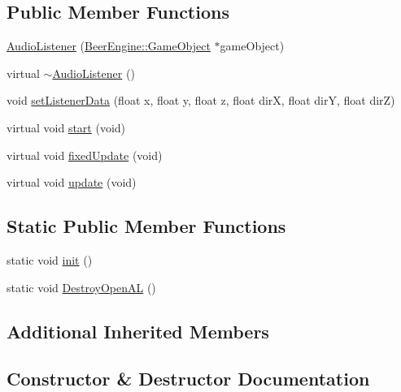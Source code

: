\subsection*{Public Member Functions}
\begin{DoxyCompactItemize}
\item 
\mbox{\hyperlink{class_beer_engine_1_1_audio_1_1_audio_listener_a7f652b4e6cd4df8038630081fa475d62}{Audio\+Listener}} (\mbox{\hyperlink{class_beer_engine_1_1_game_object}{Beer\+Engine\+::\+Game\+Object}} $\ast$game\+Object)
\item 
virtual \mbox{\hyperlink{class_beer_engine_1_1_audio_1_1_audio_listener_a7fb8733754e4c09b5a32792b3beb78b1}{$\sim$\+Audio\+Listener}} ()
\item 
void \mbox{\hyperlink{class_beer_engine_1_1_audio_1_1_audio_listener_a8d22256683171dcdc258a5e3f707701c}{set\+Listener\+Data}} (float x, float y, float z, float dirX, float dirY, float dirZ)
\item 
virtual void \mbox{\hyperlink{class_beer_engine_1_1_audio_1_1_audio_listener_a1d4d5e21f30edb7dba64e87f0712c3b3}{start}} (void)
\item 
virtual void \mbox{\hyperlink{class_beer_engine_1_1_audio_1_1_audio_listener_ad3d6b34a33582c17e2c7bc250e4e6937}{fixed\+Update}} (void)
\item 
virtual void \mbox{\hyperlink{class_beer_engine_1_1_audio_1_1_audio_listener_a32c348d619ff2ca57d16af803d7dfcfd}{update}} (void)
\end{DoxyCompactItemize}
\subsection*{Static Public Member Functions}
\begin{DoxyCompactItemize}
\item 
static void \mbox{\hyperlink{class_beer_engine_1_1_audio_1_1_audio_listener_ab5d881529114f89d6d01a043f84fc14e}{init}} ()
\item 
static void \mbox{\hyperlink{class_beer_engine_1_1_audio_1_1_audio_listener_acff5f055ac723e3842beb7bc9c7483c6}{Destroy\+Open\+AL}} ()
\end{DoxyCompactItemize}
\subsection*{Additional Inherited Members}


\subsection{Constructor \& Destructor Documentation}
\mbox{\label{class_beer_engine_1_1_audio_1_1_audio_listener_a7f652b4e6cd4df8038630081fa475d62}} 

